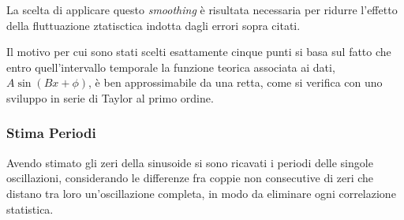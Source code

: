 \documentclass[a4paper,11pt,oneside]{article}
\begin{document}


La scelta di applicare questo \textit{smoothing} è risultata necessaria per ridurre l'effetto della fluttuazione ztatisctica indotta dagli errori sopra citati. 

Il motivo per cui sono stati scelti esattamente cinque punti si basa sul fatto che entro quell'intervallo temporale la funzione teorica associata ai dati, $A \sin (Bx+\phi)$, è ben approssimabile da una retta, come si verifica con uno sviluppo in serie di Taylor al primo ordine.










\subsubsection{Stima Periodi}
Avendo stimato gli zeri della sinusoide si sono ricavati i periodi delle singole oscillazioni, considerando le differenze fra coppie non consecutive di zeri che distano tra loro un'oscillazione completa, in modo da eliminare ogni correlazione statistica.
\end{document}
